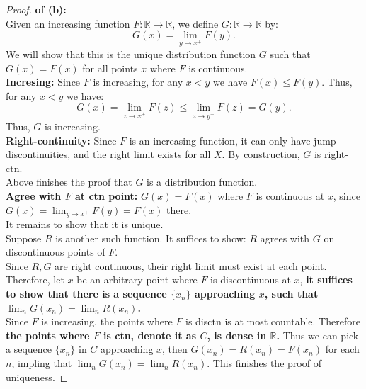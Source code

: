 \documentclass[lang=cn,11pt]{elegantbook}
\begin{document}
\begin{proof} \textbf{of (b):}\\
Given an increasing function \( F: \mathbb{R} \to \mathbb{R} \), we define $G:\mathbb{R} \to \mathbb{R}$ by:
\[
G(x) = \lim_{y \to x^+} F(y).
\]
We will show that this is the unique distribution function $G$ such that $G(x)=F(x)$ for all points $x$ where $F$ is continuous.\\
\textbf{Incresing:} Since \( F \) is increasing, for any \( x < y \) we have \( F(x) \le F(y) \). Thus, for any \( x < y \) we have:
\[
G(x) = \lim_{z \to x^+} F(z) \le \lim_{z \to y^+} F(z) = G(y).
\]
Thus, \( G \) is increasing.\\
\textbf{Right-continuity:} Since $F$ is an increasing function, it can only have jump discontinuities, and the right limit exists for all $X$. By construction, $G$ is right-ctn.\\
Above finishes the proof that $G$ is a distribution function.\\
\textbf{Agree with $F$ at ctn point:} $G(x) = F(x)$ where $F$ is continuous at $x$, since $G(x) = \lim_{y\to x^+} F(y) = F(x) $ there.\\

It remains to show that it is unique.\\
Suppose $R$ is another such function. It suffices to show: $R $ agrees with $G$ on discontinuous points of $F$.\\
Since $R,G$ are right continuous, their right limit must exist at each point. Therefore, let $x$ be an arbitrary point where $F$ is discontinuous at $x$, \textbf{it suffices to show that there is a sequence $\{x_n\}$ approaching $x$, such that $\lim_n G(x_n)  = \lim_n R(x_n)$.}\\
Since $F$ is increasing, the points where $F$ is disctn is at most countable. Therefore\textbf{ the points where $F$ is ctn, denote it as $C$, is dense in $\mathbb{R}$.} Thus we can pick a sequence $\{x_n\}$ in $C$ approaching $x$, then $G(x_n) = R(x_n) = F(x_n)$ for each $n$, impling that $\lim_n G(x_n)  = \lim_n R(x_n)$. This finishes the proof of uniqueness.

\end{proof}



\begin{comment}
Claim 1: 任何 $F: \mathbb{R} \to \mathbb{R}$ 如果是 increasing 的, 它的不连续点一定可数. 从而连续点一定稠密. 
假设 R(x) 是一个在连续点上和 F(x) 相同的 distribution function. Take arbitrary $y$ where F is not ctn on $Y$.
\end{comment}
\end{document}
